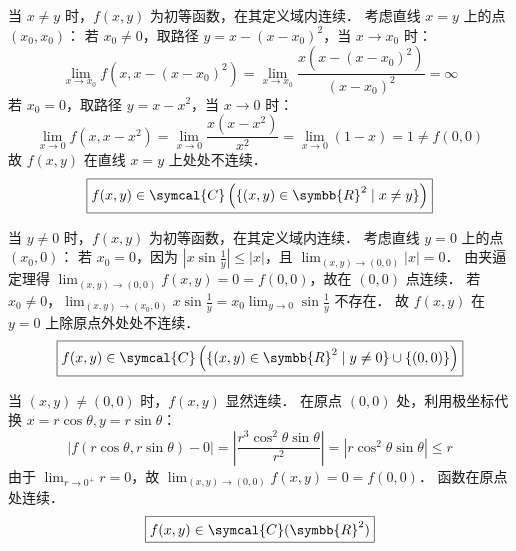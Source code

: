 \begin{solution}

    当 $x \neq y$ 时，$f(x, y)$ 为初等函数，在其定义域内连续．
    考虑直线 $x = y$ 上的点 $(x_0, x_0)$：
    若 $x_0 \neq 0$，取路径 $y = x - (x-x_0)^2$，当 $x \to x_0$ 时：
    \begin{equation}
        \lim_{x \to x_0} f(x, x - (x-x_0)^2) = \lim_{x \to x_0} \frac{x(x - (x-x_0)^2)}{(x-x_0)^2} = \infty
    \end{equation}
    若 $x_0 = 0$，取路径 $y = x - x^2$，当 $x \to 0$ 时：
    \begin{equation}
        \lim_{x \to 0} f(x, x - x^2) = \lim_{x \to 0} \frac{x(x - x^2)}{x^2} = \lim_{x \to 0} (1 - x) = 1 \neq f(0, 0)
    \end{equation}
    故 $f(x, y)$ 在直线 $x = y$ 上处处不连续．
    \begin{equation}
        \boxed{f(x, y) \in \symcal{C}\left( \{(x, y) \in \symbb{R}^2 \mid x \neq y\} \right)}
    \end{equation}


    当 $y \neq 0$ 时，$f(x, y)$ 为初等函数，在其定义域内连续．
    考虑直线 $y = 0$ 上的点 $(x_0, 0)$：
    若 $x_0 = 0$，因为 $\left| x \sin \frac{1}{y} \right| \le |x|$，且 $\lim_{(x, y) \to (0, 0)} |x| = 0$．
    由夹逼定理得 $\lim_{(x, y) \to (0, 0)} f(x, y) = 0 = f(0, 0)$，故在 $(0, 0)$ 点连续．
    若 $x_0 \neq 0$，$\lim_{(x, y) \to (x_0, 0)} x \sin \frac{1}{y} = x_0 \lim_{y \to 0} \sin \frac{1}{y}$ 不存在．
    故 $f(x, y)$ 在 $y = 0$ 上除原点外处处不连续．
    \begin{equation}
        \boxed{f(x, y) \in \symcal{C}\left( \{(x, y) \in \symbb{R}^2 \mid y \neq 0\} \cup \{(0, 0)\} \right)}
    \end{equation}


    当 $(x, y) \neq (0, 0)$ 时，$f(x, y)$ 显然连续．
    在原点 $(0, 0)$ 处，利用极坐标代换 $x = r \cos \theta, y = r \sin \theta$：
    \begin{equation}
        |f(r \cos \theta, r \sin \theta) - 0| = \left| \frac{r^3 \cos^2 \theta \sin \theta}{r^2} \right| = |r \cos^2 \theta \sin \theta| \le r
    \end{equation}
    由于 $\lim_{r \to 0^+} r = 0$，故 $\lim_{(x, y) \to (0, 0)} f(x, y) = 0 = f(0, 0)$．
    函数在原点处连续．
    \begin{equation}
        \boxed{f(x, y) \in \symcal{C}(\symbb{R}^2)}
    \end{equation}


\end{solution}
